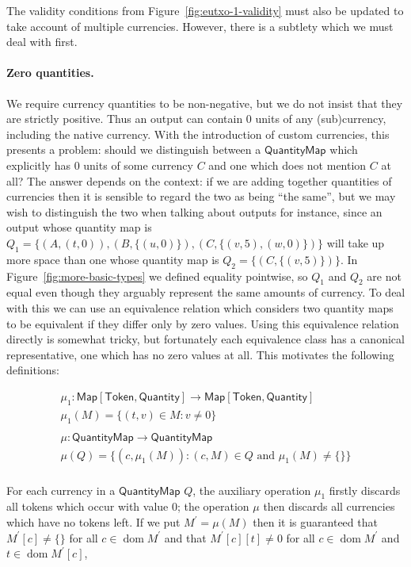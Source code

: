 \documentclass[a4paper]{article}
\newcommand{\s}{\textsf}  %
\theoremstyle{definition}  %
\newcommand{\Map}[2]{\ensuremath{\s{Map}[#1,#2]}}
\newcommand{\dom}{\ensuremath{\mathop{\mathrm{dom}}}}
\newcommand{\qty}{\ensuremath{\s{Quantity}}}
\newcommand{\token}{\ensuremath{\s{Token}}}
\newcommand{\qtymap}{\ensuremath{\s{QuantityMap}}}
\begin{document}
\bigskip
\noindent The validity conditions from
Figure~\ref{fig:eutxo-1-validity} must also be updated to take account
of multiple currencies.  However, there is a subtlety which we must
deal with first.

\paragraph{Zero quantities.}  We require currency quantities to be
non-negative, but we do not insist that they are strictly positive.
Thus an output can contain 0 units of any (sub)currency, including the
native currency.  With the introduction of custom currencies, this
presents a problem: should we distinguish between a $\qtymap$ which
explicitly has 0 units of some currency $C$ and one which does not
mention $C$ at all?  The answer depends on the context: if we are
adding together quantities of currencies then it is sensible to regard
the two as being ``the same'', but we may wish to distinguish the two
when talking about outputs for instance, since an output whose
quantity map is
$Q_1 = \{(A,{(t,0)}), (B,\{(u,0)\}), (C,\{(v,5), (w,0)\})\}$ will take
up more space than one whose quantity map is $Q_2 = \{(C,\{(v,5)\})\}$.
In Figure~\ref{fig:more-basic-types} we defined equality pointwise, so
$Q_1$ and $Q_2$ are not equal even though they arguably represent the
same amounts of currency.  To deal with this we can use an equivalence
relation which considers two quantity maps to be equivalent if they
differ only by zero values. Using this equivalence relation directly
is somewhat tricky, but fortunately each equivalence class has a
canonical representative, one which has no zero values at all. This
motivates the following definitions:

\begin{gather*}
  \mu_1: \Map{\token}{\qty} \rightarrow \Map{\token}{\qty} \\
  \mu_1(M) = \{(t,v) \in M: v \ne 0\}\\
  \\
  \mu: \qtymap  \rightarrow \qtymap\\
  \mu(Q) = \{(c,\mu_1(M)): (c,M) \in Q \mbox{ and } \mu_1(M) \ne \{\}\}\\
\end{gather*}

\newcommand{\mprime}{M^{\prime}}

\noindent For each currency in a $\qtymap$ $Q$, the auxiliary
operation $\mu_1$ firstly discards all tokens which occur with value
0; the operation $\mu$ then discards all currencies which have no
tokens left.  If we put $\mprime = \mu(M)$ then it is guaranteed that
$\mprime[c] \ne \{\}$ for all $c \in \dom{\mprime}$ and that
$M^{\prime}[c][t] \ne 0$ for all $c \in \dom{M^{\prime}}$ and
$t \in \dom{M^{\prime}[c]}$,
  
\end{document}

